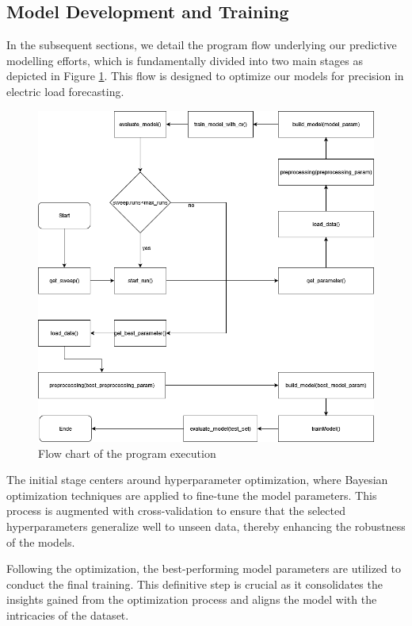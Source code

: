 \documentclass{article} %
\begin{document}
\subsection{Model Development and Training}
In the subsequent sections, we detail the program flow underlying our predictive modelling efforts, which is fundamentally divided into two main stages as depicted in Figure \ref{fig.:flowChart}. This flow is designed to optimize our models for precision in electric load forecasting. 
\begin{figure}[h]
\begin{center}
\includegraphics[width=\textwidth]{ressources/CSOAII.drawio(1).png}
\end{center}
\caption{Flow chart of the program execution}
\label{fig.:flowChart}
\end{figure}

The initial stage centers around hyperparameter optimization, where Bayesian optimization techniques are applied to fine-tune the model parameters. This process is augmented with cross-validation to ensure that the selected hyperparameters generalize well to unseen data, thereby enhancing the robustness of the models. 

Following the optimization, the best-performing model parameters are utilized to conduct the final training. This definitive step is crucial as it consolidates the insights gained from the optimization process and aligns the model with the intricacies of the dataset. 
\end{document}
